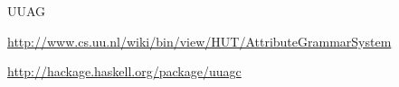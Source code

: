 \begin{hcarentry}[updated]{UUAG}
\FurtherReading
\begin{compactitem}
\item
  \url{http://www.cs.uu.nl/wiki/bin/view/HUT/AttributeGrammarSystem}
\item
  \url{http://hackage.haskell.org/package/uuagc}
\end{compactitem}
\end{hcarentry}
